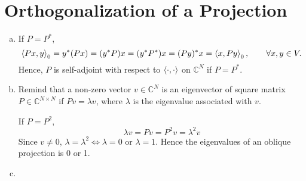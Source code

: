 \section{Orthogonalization of a Projection}\label{sec:part3}

\begin{enumerate}[(a)]
\item If $P = P^*$,
\[\left\langle Px, y \right\rangle_0 = y^* (Px) = (y^*P)x = (y^*P^*)x = (Py)^*x = \left\langle x, Py \right\rangle_0, \qquad \forall x, y \in V.\]
Hence, $P$ is self-adjoint with respect to $\left\langle \cdot, \cdot \right\rangle$ on $\mathbb{C}^N$ if $P = P^*$.

\item Remind that a non-zero vector $v \in \mathbb{C}^N$ is an eigenvector of square matrix $P \in \mathbb{C}^{N\times N}$ if $Pv = \lambda v$, where $\lambda$ is the eigenvalue associated with $v$. 

If $P = P^2$,
\[\lambda v = P v = P^2 v = \lambda^2 v\]
Since $v \neq 0$, $\lambda = \lambda^2 \Leftrightarrow \lambda = 0 \text{ or } \lambda = 1$. Hence the eigenvalues of an oblique projection is 0 or 1.

\item
\end{enumerate}